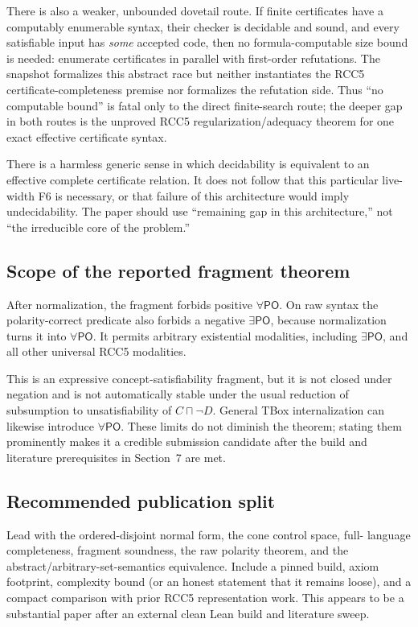 \documentclass[11pt]{article}
\newcommand{\PO}{\ensuremath{\mathsf{PO}}}
\begin{document}
There is also a weaker, unbounded dovetail route.  If finite certificates have
a computably enumerable syntax, their checker is decidable and sound, and every
satisfiable input has \emph{some} accepted code, then no formula-computable size
bound is needed: enumerate certificates in parallel with first-order
refutations.  The snapshot formalizes this abstract race but neither instantiates
the RCC5 certificate-completeness premise nor formalizes the refutation side.
Thus ``no computable bound'' is fatal only to the direct finite-search route;
the deeper gap in both routes is the unproved RCC5 regularization/adequacy
theorem for one exact effective certificate syntax.

There is a harmless generic sense in which decidability is equivalent to an
effective complete certificate relation.  It does not follow that this
particular live-width F6 is necessary, or that failure of this architecture
would imply undecidability.  The paper should use ``remaining gap in this
architecture,'' not ``the irreducible core of the problem.''

\subsection{Scope of the reported fragment theorem}

After normalization, the fragment forbids positive \(\forall\PO\).  On raw
syntax the polarity-correct predicate also forbids a negative
\(\exists\PO\), because normalization turns it into \(\forall\PO\).  It permits
arbitrary existential modalities, including \(\exists\PO\), and all other
universal RCC5 modalities.

This is an expressive concept-satisfiability fragment, but it is not closed
under negation and is not automatically stable under the usual reduction of
subsumption to unsatisfiability of \(C\sqcap\neg D\).  General TBox
internalization can likewise introduce \(\forall\PO\).  These limits do not
diminish the theorem; stating them prominently makes it a credible submission
candidate after the build and literature prerequisites in Section~7 are met.

\subsection{Recommended publication split}

\begin{resultbox}
Lead with the ordered-disjoint normal form, the cone control space, full-
language completeness, fragment soundness, the raw polarity theorem, and the
abstract/arbitrary-set-semantics equivalence.  Include a pinned build, axiom footprint,
complexity bound (or an honest statement that it remains loose), and a compact
comparison with prior RCC5 representation work.  This appears to be a
substantial paper after an external clean Lean build and literature sweep.
\end{resultbox}
\end{document}
